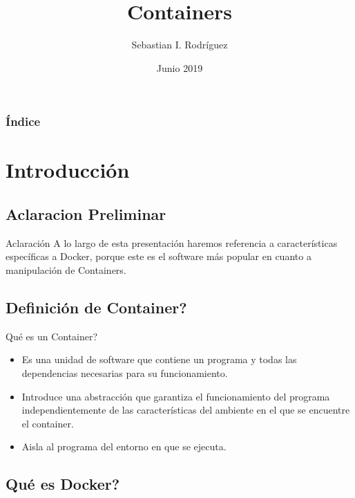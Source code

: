 \documentclass{beamer}
\title{Containers}
\author[S. I. Rodríguez]{Sebastian I. Rodríguez}
\institute
{
  Instituto Politécnico Superior Gral. San Martín
}
\date{Junio 2019}
\begin{document}
\begin{frame}
  \titlepage
\end{frame}

\begin{frame}
  \frametitle{Índice}
  \begin{multicols*}{2}
	\tableofcontents
  \end{multicols*}

\end{frame}

\section{Introducción}

\subsection{Aclaracion Preliminar}

\begin{frame}{Aclaración}
	A lo largo de esta presentación haremos referencia a características específicas a Docker, porque este es el software más popular en cuanto a manipulación de Containers.
\end{frame}

\subsection{Definición de Container?}

\begin{frame}{Qué es un Container?}

  \begin{itemize}
  \item
    Es una unidad de software que contiene un programa y todas las dependencias necesarias para su funcionamiento.
  \item
   Introduce una abstracción que garantiza el funcionamiento del programa independientemente de las características del ambiente en el que se encuentre el container.
  \item 
  Aisla al programa del entorno en que se ejecuta.
  \end{itemize}
\end{frame}

\subsection{Qué es Docker?}
\end{document}
